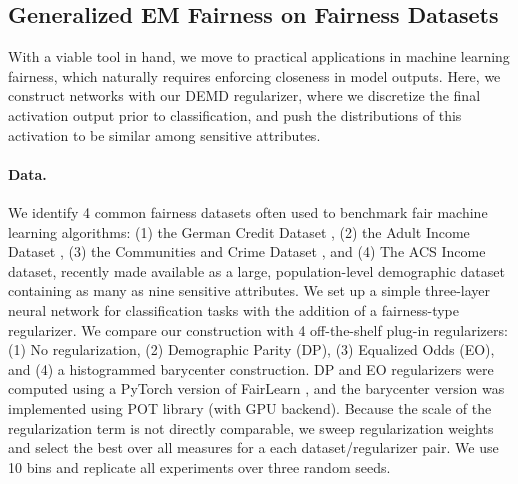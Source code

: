 

\subsection{Generalized EM Fairness on Fairness Datasets}
With a viable tool in hand, we move to practical applications in machine learning fairness,
which naturally requires
enforcing closeness in model outputs.
Here, we construct networks with our DEMD regularizer,
where we discretize the final activation output
prior to classification,
and push the distributions of this activation to be similar
among sensitive attributes.

\paragraph{Data.}
We identify 4 common fairness datasets often used to benchmark
fair machine learning algorithms: (1) the German Credit Dataset \citep{german}, (2) the Adult Income Dataset \citep{uci}, (3) the Communities and Crime Dataset \citep{crime}, and (4) The ACS Income dataset, recently made available as a large, population-level demographic dataset \citep{ding2021retiring} containing as many as nine sensitive attributes. We set up a simple three-layer neural network for classification tasks with the addition of a fairness-type regularizer. We compare our construction with 4 off-the-shelf plug-in regularizers: (1) No regularization, (2) Demographic Parity (DP), (3) Equalized Odds (EO), and (4) a histogrammed barycenter construction. DP and EO regularizers were computed using a PyTorch version of FairLearn \citep{bird2020fairlearn}, and the barycenter version was implemented using POT library (with GPU backend). Because the scale of the regularization term is not directly comparable, we sweep regularization weights and select the best over all measures for a each dataset/regularizer pair. 
We use 10 bins and replicate all experiments over three random seeds.

